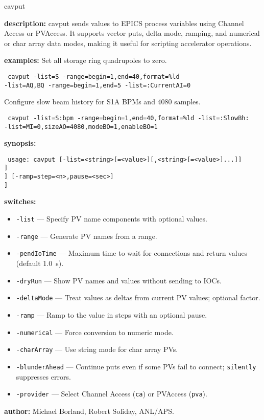 \begin{sddsprog}{cavput}
\item \textbf{description:}
    cavput sends values to EPICS process variables using Channel Access or PVAccess. It supports vector puts, delta mode, ramping, and numerical or char array data modes, making it useful for scripting accelerator operations.
\item \textbf{examples:}
    Set all storage ring quadrupoles to zero.
    \begin{flushleft}{\tt
    cavput -list=S -range=begin=1,end=40,format=\%ld\\
      -list=AQ,BQ -range=begin=1,end=5 -list=:CurrentAI=0
    }\end{flushleft}
    Configure slow beam history for S1A BPMs and 4080 samples.
    \begin{flushleft}{\tt
    cavput -list=S:bpm -range=begin=1,end=40,format=\%ld -list=:SlowBh:\\
      -list=MI=0,sizeAO=4080,modeBO=1,enableBO=1
    }\end{flushleft}
\item \textbf{synopsis:}
    \begin{flushleft}{\tt
usage: cavput [-list=<string>[=<value>][,<string>[=<value>]...]]\\\relax
      [-range=begin=<integer>,end=<integer>[,format=<string>][,interval=<integer>]]\\\relax
      [-pendIoTime=<seconds>] [-dryRun] [-deltaMode[=factor=<value>]] [-ramp=step=<n>,pause=<sec>]\\\relax
      [-numerical] [-charArray] [-blunderAhead[=silently]]\\\relax
      [-provider=\{ca|pva\}]
    }\end{flushleft}
\item \textbf{switches:}
\begin{itemize}
  \item {\tt -list} --- Specify PV name components with optional values.
  \item {\tt -range} --- Generate PV names from a range.
  \item {\tt -pendIoTime} --- Maximum time to wait for connections and return values (default 1.0~s).
  \item {\tt -dryRun} --- Show PV names and values without sending to IOCs.
  \item {\tt -deltaMode} --- Treat values as deltas from current PV values; optional factor.
  \item {\tt -ramp} --- Ramp to the value in steps with an optional pause.
  \item {\tt -numerical} --- Force conversion to numeric mode.
  \item {\tt -charArray} --- Use string mode for char array PVs.
  \item {\tt -blunderAhead} --- Continue puts even if some PVs fail to connect; \verb|silently| suppresses errors.
  \item {\tt -provider} --- Select Channel Access ({\tt ca}) or PVAccess ({\tt pva}).
\end{itemize}
\item \textbf{author:} Michael Borland, Robert Soliday, ANL/APS.
\end{sddsprog}
